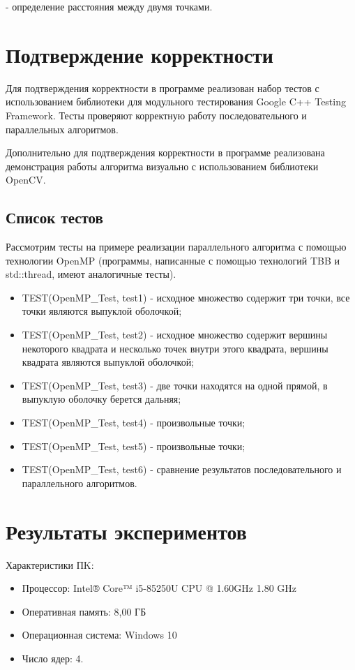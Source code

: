 \documentclass{article}
\begin{document}
- определение расстояния между двумя точками.

\newpage

\section{Подтверждение корректности}
Для подтверждения корректности в программе реализован набор тестов с использованием библиотеки для модульного тестирования Google C++ Testing Framework. Тесты проверяют корректную работу последовательного и параллельных алгоритмов.

\par Дополнительно для подтверждения корректности в программе реализована демонстрация работы алгоритма визуально с использованием библиотеки OpenCV.

\subsection{Список тестов}

Рассмотрим тесты на примере реализации параллельного алгоритма с помощью технологии OpenMP (программы, написанные с помощью технологий TBB и std::thread, имеют аналогичные тесты).

\begin{itemize}
\item TEST(OpenMP\_Test, test1) - исходное множество содержит три точки, все точки являются выпуклой оболочкой;
\item TEST(OpenMP\_Test, test2) - исходное множество содержит вершины некоторого квадрата и несколько точек внутри этого квадрата, вершины квадрата являются выпуклой оболочкой;
\item TEST(OpenMP\_Test, test3) - две точки находятся на одной прямой, в выпуклую оболочку берется дальняя;
\item TEST(OpenMP\_Test, test4) - произвольные точки;
\item TEST(OpenMP\_Test, test5) - произвольные точки;
\item TEST(OpenMP\_Test, test6) - сравнение результатов последовательного и параллельного алгоритмов.
\end{itemize}

\newpage

\section{Результаты экспериментов}
Характеристики ПK:

\begin{itemize}
\item Процессор: Intel® Core™ i5-85250U CPU @ 1.60GHz 1.80 GHz
\item Оперативная память: 8,00 ГБ
\item Операционная система: Windows 10
\item Число ядер: 4.
\end{itemize}
\end{document}
